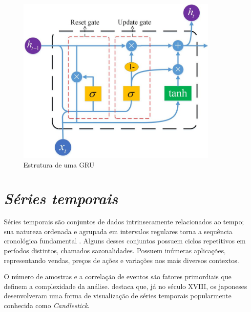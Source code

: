\begin{figure}[!htb] \centering
  \caption{Estrutura de uma GRU} \label{figura:gru}
  \begin{varwidth}{\linewidth}
    \includegraphics[width=10cm]{figuras/gru.png}
  \end{varwidth}
\end{figure}

\section{\textit{Séries temporais}} \label{sec:temp}
Séries temporais são conjuntos de dados intrinsecamente relacionados ao tempo; sua natureza ordenada e agrupada em intervalos regulares
torna a sequência cronológica fundamental \cite{Esling}. Alguns desses conjuntos possuem ciclos repetitivos em períodos distintos, chamados sazonalidades. 
Possuem inúmeras aplicações, representando vendas, preços de ações e variações nos mais diversos contextos.

O número de amostras e a correlação de eventos são fatores primordiais que definem a complexidade da análise.
\textcite{Nison} destaca que, já no século XVIII, os japoneses desenvolveram uma forma de
visualização de séries temporais popularmente conhecida como \textit{Candlestick}.




